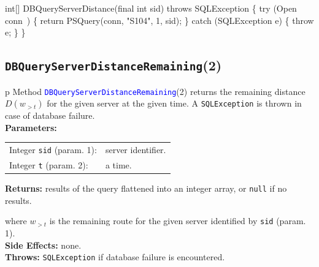 int[] DBQueryServerDistance(final int sid) throws SQLException \{
  try (\LA{}Open \code{}conn\edoc{}~{\nwtagstyle{}}\RA{}) \{
    return PSQuery(conn, "S104", 1, sid);
  \} catch (SQLException e) \{
    throw e;
  \}
\}
\eatline
{}\nwendcode{}\nwdocspar
\subsection{\texttt{DBQueryServerDistanceRemaining}(2)}
\begin{tabular}{p{\textwidth}}
\toprule
{}
Method \textcolor{blue}{{\tt{}\protect{}DBQueryServerDistanceRemaining}}(2) returns the
remaining distance $D(w_{>t})$ for the given server at the given time.
A {\tt{}SQLException} is thrown in case of database failure.\\
\midrule
\textbf{Parameters:} \\
\begin{tabular}{lp{116mm}}
Integer {\tt{}sid} (param. 1):&server identifier.\\
Integer {\tt{}t} (param. 2):&a time.\\
\end{tabular}
\textbf{Returns:} results of the query flattened into an integer array,
or {\tt{}null} if no results.


where $w_{>t}$ is the remaining route for the given server identified by {\tt{}sid} (param. 1).\\
\textbf{Side Effects:} none.\\
\textbf{Throws:} {\tt{}SQLException} if database failure is encountered.\\
\bottomrule
\end{tabular}
\nwenddocs{}\endmoddef{}
